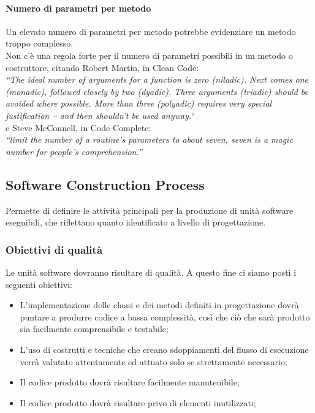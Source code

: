 \documentclass[../PianoDiQualifica.tex]{subfiles}
\begin{document}
			\paragraph{Numero di parametri per metodo}
				Un elevato numero di parametri per metodo potrebbe evidenziare un metodo troppo complesso.\\
				Non c'è una regola forte per il numero di parametri possibili in un metodo o costruttore, citando Robert Martin, in Clean Code:\\
\textit{“The ideal number of arguments for a function is zero (niladic). Next comes one (monadic), followed closely by two (dyadic). Three arguments (triadic) should be avoided where possible. More than three (polyadic) requires very special justification – and then shouldn’t be used anyway.“}\\
e Steve McConnell, in Code Complete:\\
\textit{“limit the number of a routine’s parameters to about seven, seven is a magic number for people’s comprehension.”}\\
			
		
		\subsection{Software Construction Process}
		Permette di definire le attività principali per la produzione di unità software eseguibili, che riflettano quanto identificato a livello di progettazione.
		
			\subsubsection{Obiettivi di qualità}
			Le unità software dovranno risultare di qualità. A questo fine ci siamo posti i seguenti obiettivi:
			\begin{itemize}
				\item L'implementazione delle classi e dei metodi definiti in progettazione dovrà puntare a produrre codice a bassa complessità, così che ciò che sarà prodotto sia facilmente comprensibile e testabile;
				\item L'uso di costrutti e tecniche che creano sdoppiamenti del flusso di esecuzione verrà valutato attentamente ed attuato solo se strettamente necessario;
				\item Il codice prodotto dovrà risultare facilmente manutenibile;
				\item Il codice prodotto dovrà risultare privo di elementi inutilizzati;
			\end{itemize}
			
\end{document}
